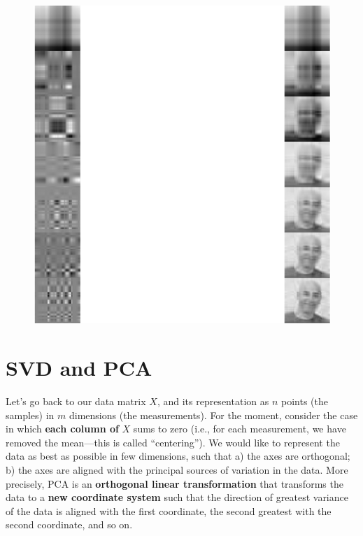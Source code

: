 \documentclass[
  letterpaper,
  DIV=11,
  numbers=noendperiod]{scrreprt}
\begin{document}
\begin{figure}[H]

{\centering \includegraphics{./11-SVD_PCA_files/figure-pdf/unnamed-chunk-6-1.pdf}

}

\end{figure}

\hypertarget{svd-and-pca}{%
\section{SVD and PCA}\label{svd-and-pca}}

Let's go back to our data matrix \(X\), and its representation as \(n\)
points (the samples) in \(m\) dimensions (the measurements). For the
moment, consider the case in which \textbf{each column of} \(X\) sums to
zero (i.e., for each measurement, we have removed the mean---this is
called ``centering''). We would like to represent the data as best as
possible in few dimensions, such that a) the axes are orthogonal; b) the
axes are aligned with the principal sources of variation in the data.
More precisely, PCA is an \textbf{orthogonal linear transformation} that
transforms the data to a \textbf{new coordinate system} such that the
direction of greatest variance of the data is aligned with the first
coordinate, the second greatest with the second coordinate, and so on.
\end{document}
